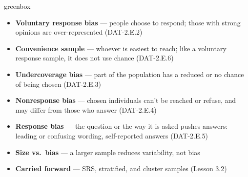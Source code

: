 \documentclass[10pt]{article}
\begin{document}
\boxguard
\begin{skillbox}{greenbox}
\begin{minipage}[t]{0.48\linewidth}
    \begin{itemize}
        \item \textbf{Voluntary response bias} --- people choose to respond; those with strong
              opinions are over-represented (DAT-2.E.2)
        \item \textbf{Convenience sample} --- whoever is easiest to reach; like a voluntary
              response sample, it does not use chance (DAT-2.E.6)
        \item \textbf{Undercoverage bias} --- part of the population has a reduced or no chance
              of being chosen (DAT-2.E.3)
    \end{itemize}
\end{minipage}
\hfill
\begin{minipage}[t]{0.48\linewidth}
    \begin{itemize}
        \item \textbf{Nonresponse bias} --- chosen individuals can't be reached or refuse, and
              may differ from those who answer (DAT-2.E.4)
        \item \textbf{Response bias} --- the question or the way it is asked pushes answers:
              leading or confusing wording, self-reported answers (DAT-2.E.5)
        \item \textbf{Size vs.\ bias} --- a larger sample reduces variability, not bias
        \item \textbf{Carried forward} --- SRS, stratified, and cluster samples (Lesson 3.2)
    \end{itemize}
\end{minipage}
\end{skillbox}
\end{document}
